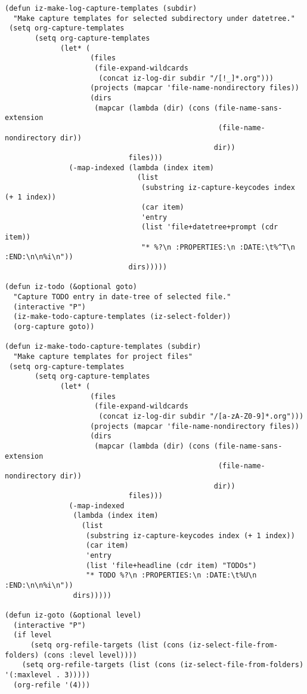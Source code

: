 \documentclass{article}
\begin{document}
\begin{verbatim}
(defun iz-make-log-capture-templates (subdir)
  "Make capture templates for selected subdirectory under datetree."
 (setq org-capture-templates
       (setq org-capture-templates
             (let* (
                    (files
                     (file-expand-wildcards
                      (concat iz-log-dir subdir "/[!_]*.org")))
                    (projects (mapcar 'file-name-nondirectory files))
                    (dirs
                     (mapcar (lambda (dir) (cons (file-name-sans-extension
                                                  (file-name-nondirectory dir))
                                                 dir))
                             files)))
               (-map-indexed (lambda (index item)
                               (list
                                (substring iz-capture-keycodes index (+ 1 index))
                                (car item)
                                'entry
                                (list 'file+datetree+prompt (cdr item))
                                "* %?\n :PROPERTIES:\n :DATE:\t%^T\n :END:\n\n%i\n"))
                             dirs)))))

(defun iz-todo (&optional goto)
  "Capture TODO entry in date-tree of selected file."
  (interactive "P")
  (iz-make-todo-capture-templates (iz-select-folder))
  (org-capture goto))

(defun iz-make-todo-capture-templates (subdir)
  "Make capture templates for project files"
 (setq org-capture-templates
       (setq org-capture-templates
             (let* (
                    (files
                     (file-expand-wildcards
                      (concat iz-log-dir subdir "/[a-zA-Z0-9]*.org")))
                    (projects (mapcar 'file-name-nondirectory files))
                    (dirs
                     (mapcar (lambda (dir) (cons (file-name-sans-extension
                                                  (file-name-nondirectory dir))
                                                 dir))
                             files)))
               (-map-indexed
                (lambda (index item)
                  (list
                   (substring iz-capture-keycodes index (+ 1 index))
                   (car item)
                   'entry
                   (list 'file+headline (cdr item) "TODOs")
                   "* TODO %?\n :PROPERTIES:\n :DATE:\t%U\n :END:\n\n%i\n"))
                dirs)))))

(defun iz-goto (&optional level)
  (interactive "P")
  (if level
      (setq org-refile-targets (list (cons (iz-select-file-from-folders) (cons :level level))))
    (setq org-refile-targets (list (cons (iz-select-file-from-folders) '(:maxlevel . 3)))))
  (org-refile '(4)))


\end{verbatim}
\end{document}
